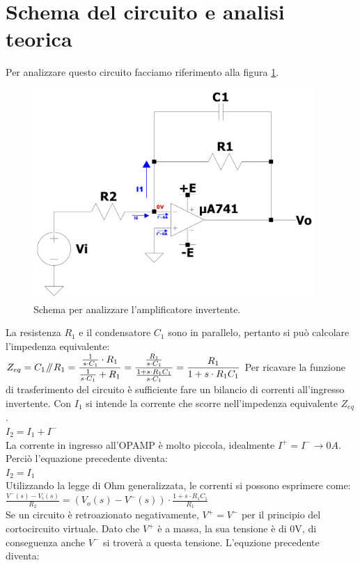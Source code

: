 \documentclass{report}
\newcommand{\parallelsum}{\mathbin{\!/\mkern-5mu/\!}}
\begin{document}
\section{Schema del circuito e analisi teorica}
\noindent Per analizzare questo circuito facciamo riferimento alla figura \ref{figura:cto_analisi}.
\begin{figure}[h]
\centering
\includegraphics[height=8cm]{immagini/cto_filtro_analisi}
\caption{Schema per analizzare l'amplificatore invertente.}
\label{figura:cto_analisi}
\end{figure}
La resistenza $R_1$ e il condensatore $C_1$ sono in parallelo, pertanto si può calcolare l'impedenza equivalente:
\\[4pt]\indent$\displaystyle{Z_{eq}=C_1\parallelsum R_1=\frac{\frac{1}{s\cdot C_1} \cdot R_1}{\frac{1}{s\cdot C_1} + R_1}=\frac{\frac{R_1}{s\cdot C_1}}{\frac{1+s\cdot R_1C_1}{s\cdot C_1}}=\frac{R_1}{1+s\cdot R_1C_1}}$
\newpage \noindent Per ricavare la funzione di trasferimento del circuito è sufficiente fare un bilancio di correnti all'ingresso invertente. Con $I_1$ si intende la corrente che scorre nell'impedenza equivalente $Z_{eq}$.
\\[2pt]\indent $I_2=I_1+I^-$
\\[2pt]La corrente in ingresso all'OPAMP è molto piccola, idealmente $I^+=I^-\rightarrow 0A$. Perciò l'equazione precedente diventa:
\\\indent $\displaystyle{I_2=I_1}$
\\Utilizzando la legge di Ohm generalizzata, le correnti si possono esprimere come:
\\[2pt]\indent $\displaystyle{\frac{V^-(s)-V_i(s)}{R_2}=(V_o(s)-V^-(s))\cdot\frac{1+s\cdot R_1C_1}{R_1}}$
\\[2pt]Se un circuito è retroazionato negativamente, $V^+=V^-$ per il principio del cortocircuito virtuale. Dato che $V^+$ è a massa, la sua tensione è di 0V, di conseguenza anche $V^-$ si troverà a questa tensione. L'equzione precedente diventa:
\end{document}
